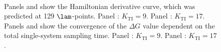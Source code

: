 \begin{figure}[H]
  \centering
   \\%
   \caption{\footnotesize{}%
     Panels \protect{} and  \protect{} show the Hamiltonian derivative curve, which was predicted at 129 $\lam$-points. Panel \protect{}: $K_{\mathrm{TI}}=9$. Panel \protect{}: $K_{\mathrm{TI}}=17$.%
     Panels \protect{} and  \protect{} show the convergence of the $\Delta G$ value dependent on the total single-system sampling time. Panel \protect{}: $K_{\mathrm{TI}}=9$. Panel \protect{}: $K_{\mathrm{TI}}=17$.}
 \label{fig:exti}
\end{figure}


\newcommand\mbar[1]{
\subgraph{fig:bar:conv:#1}{07_exti_ana_mbar_2_conv_#1_ene_ana.pgf}{0.48}
}


